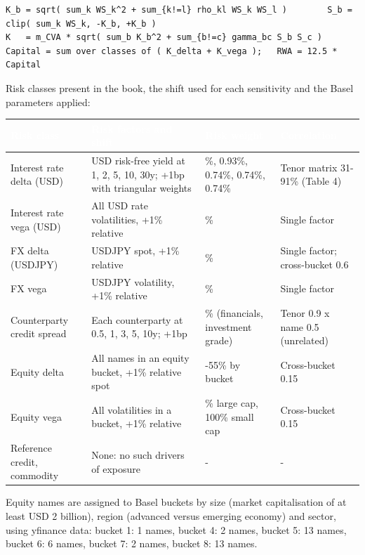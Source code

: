 \documentclass[11pt,letterpaper]{article}
\begin{document}
{\fontsize{7.2}{8.8}\selectfont
\begin{verbatim}
K_b = sqrt( sum_k WS_k^2 + sum_{k!=l} rho_kl WS_k WS_l )        S_b = clip( sum_k WS_k, -K_b, +K_b )
K   = m_CVA * sqrt( sum_b K_b^2 + sum_{b!=c} gamma_bc S_b S_c )
Capital = sum over classes of ( K_delta + K_vega );   RWA = 12.5 * Capital
\end{verbatim}}
Risk classes present in the book, the shift used for each sensitivity and the Basel parameters applied:

{\scriptsize\setlength{\LTpre}{4pt}\setlength{\LTpost}{6pt}
\begin{longtable}{>{\raggedright\arraybackslash}p{}>{\raggedright\arraybackslash}p{}>{\raggedright\arraybackslash}p{}>{\raggedright\arraybackslash}p{}}
\toprule
\rowcolor{navy}\textbf{\textcolor{white}{Risk class}} & \textbf{\textcolor{white}{Risk factors and shift}} & \textbf{\textcolor{white}{Risk weight}} & \textbf{\textcolor{white}{Correlation}} \\
\endhead
Interest rate delta (USD) & USD risk-free yield at 1, 2, 5, 10, 30y; +1bp with triangular weights & 1.11\%, 0.93\%, 0.74\%, 0.74\%, 0.74\% & Tenor matrix 31-91\% (Table 4) \\
\rowcolor{gray!9}Interest rate vega (USD) & All USD rate volatilities, +1\% relative & 100\% & Single factor \\
FX delta (USDJPY) & USDJPY spot, +1\% relative & 11\% & Single factor; cross-bucket 0.6 \\
\rowcolor{gray!9}FX vega & USDJPY volatility, +1\% relative & 100\% & Single factor \\
Counterparty credit spread & Each counterparty at 0.5, 1, 3, 5, 10y; +1bp & 5\% (financials, investment grade) & Tenor 0.9 x name 0.5 (unrelated) \\
\rowcolor{gray!9}Equity delta & All names in an equity bucket, +1\% relative spot & 30-55\% by bucket & Cross-bucket 0.15 \\
Equity vega & All volatilities in a bucket, +1\% relative & 78\% large cap, 100\% small cap & Cross-bucket 0.15 \\
\rowcolor{gray!9}Reference credit, commodity & None: no such drivers of exposure & - & - \\
\bottomrule
\end{longtable}}

Equity names are assigned to Basel buckets by size (market capitalisation of at least USD 2 billion), region (advanced versus emerging economy) and sector, using yfinance data: bucket 1: 1 names, bucket 4: 2 names, bucket 5: 13 names, bucket 6: 6 names, bucket 7: 2 names, bucket 8: 13 names.
\end{document}
